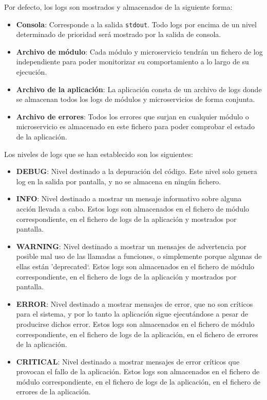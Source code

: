 Por defecto, los logs son mostrados y almacenados de la siguiente forma:

\begin{itemize}
\item \textbf{Consola}: Corresponde a la salida \texttt{stdout}. Todo logs por encima de un nivel determinado de prioridad será mostrado por la salida de consola.

\item \textbf{Archivo de módulo}: Cada módulo y microservicio tendrán un fichero de log independiente para poder monitorizar su comportamiento a lo largo de su ejecución.

\item \textbf{Archivo de la aplicación}: La aplicación consta de un archivo de logs donde se almacenan todos los logs de módulos y microservicios de forma conjunta.

\item \textbf{Archivo de errores}: Todos los errores que surjan en cualquier módulo o microservicio es almacenado en este fichero para poder comprobar el estado de la aplicación.

\end{itemize}

Los niveles de logs que se han establecido son los siguientes:

\begin{itemize}

\item \textbf{DEBUG}: Nivel destinado a la depuración del código. Este nivel solo genera log en la salida por pantalla, y no se almacena en ningún fichero.

\item \textbf{INFO}: Nivel destinado a mostrar un mensaje informativo sobre alguna acción llevada a cabo. Estos logs son almacenados en el fichero de módulo correspondiente, en el fichero de logs de la aplicación y mostrados por pantalla.

\item \textbf{WARNING}: Nivel destinado a mostrar un mensajes de advertencia por posible mal uso de las llamadas a funciones, o simplemente porque algunas de ellas están '{deprecated}`. Estos logs son almacenados en el fichero de módulo correspondiente, en el fichero de logs de la aplicación y mostrados por pantalla.

\item \textbf{ERROR}: Nivel destinado a mostrar mensajes de error, que no son críticos para el sistema, y por lo tanto la aplicación sigue ejecutándose a pesar de producirse dichos error. Estos logs son almacenados en el fichero de módulo correspondiente, en el fichero de logs de la aplicación, en el fichero de errores de la aplicación.

\item \textbf{CRITICAL}: Nivel destinado a mostrar mensajes de error críticos que provocan el fallo de la aplicación. Estos logs son almacenados en el fichero de módulo correspondiente, en el fichero de logs de la aplicación, en el fichero de errores de la aplicación.

\end{itemize}



